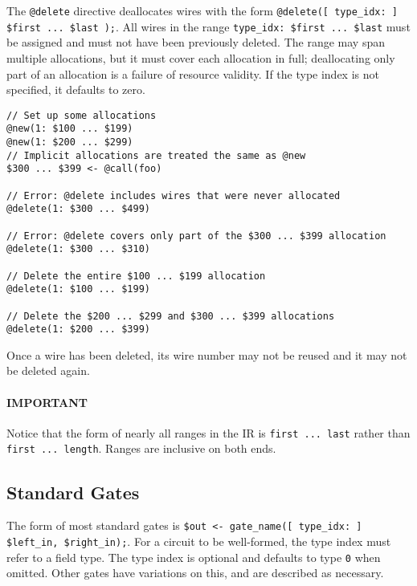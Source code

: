 The \texttt{@delete} directive deallocates wires with the form \texttt{@delete([ type\_idx: ] \$first ... \$last );}.
All wires in the range \texttt{type\_idx: \$first ... \$last} must be assigned
and must not have been previously deleted.
The range may span multiple allocations, but it must cover each allocation in
full; deallocating only part of an allocation is a failure of resource
validity.
If the type index is not specified, it defaults to zero.

%
\begin{lstlisting}[language=ir]
// Set up some allocations
@new(1: $100 ... $199)
@new(1: $200 ... $299)
// Implicit allocations are treated the same as @new
$300 ... $399 <- @call(foo)

// Error: @delete includes wires that were never allocated
@delete(1: $300 ... $499)

// Error: @delete covers only part of the $300 ... $399 allocation
@delete(1: $300 ... $310)

// Delete the entire $100 ... $199 allocation
@delete(1: $100 ... $199)

// Delete the $200 ... $299 and $300 ... $399 allocations
@delete(1: $200 ... $399)
\end{lstlisting}

Once a wire has been deleted, its wire number may not be reused and it may not be deleted again.

\paragraph{IMPORTANT} Notice that the form of nearly all ranges in the IR is \texttt{first ... last} rather than \texttt{first ... length}.
Ranges are inclusive on both ends.


\subsection{Standard Gates}
\label{subsec:standardgates}
The form of most standard gates is \texttt{\$out <- gate\_name([ type\_idx: ] \$left\_in, \$right\_in);}.
For a circuit to be well-formed, the type index must refer to a field type.
The type index is optional and defaults to type \texttt{0} when omitted.
Other gates have variations on this, and are described as necessary.\\

